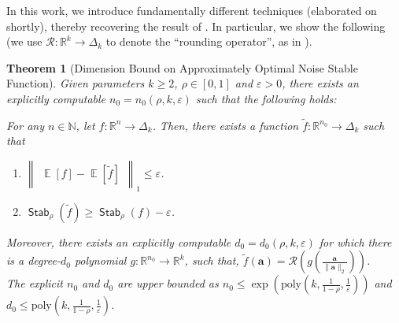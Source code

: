 \documentclass[11pt]{article}
\newcommand{\inparen}[1]{\left ( #1 \right )}
\newcommand{\norm}[2]{\begin{Vmatrix} #2 \end{Vmatrix}_{#1}}
\DeclareMathOperator*{\Ex}{\mathbb{E}}
\DeclareMathOperator*{\Stab}{\mathsf{Stab}}
\newcommand{\wtilde}[1]{\widetilde{#1}}
\newcommand{\eps}{\varepsilon}
\newcommand{\bbN}{{\mathbb N}}
\newcommand{\bbR}{{\mathbb R}}
\newcommand{\ba}{{\bm a}}
\newcommand{\calR}{\mathcal{R}}
\newcommand{\poly}{\mathrm{poly}}
\newtheorem{theorem}{Theorem}[section]
\begin{document}
In this work, we introduce fundamentally different techniques (elaborated on shortly), thereby recovering the result of \cite{DMN_NoiseStabilityComputable}. In particular, we show the following (we use $\calR : \bbR^k \to \Delta_k$ to denote the ``rounding operator'', as in ).

\begin{theorem}[Dimension Bound on Approximately Optimal Noise Stable Function]\label{th:noise-stability-informal}
	Given parameters $k \ge 2$, $\rho \in [0,1]$ and $\eps > 0$, there exists an explicitly computable $n_0 = n_0(\rho, k, \eps)$ such that the following holds:
	
	\noindent For any $n \in \bbN$, let $f : \bbR^n \to \Delta_k$. Then, there exists a function $\wtilde{f} : \bbR^{n_0} \to \Delta_k$ such that
	\begin{enumerate}
		\item $\norm{1}{\Ex[f] - \Ex[\wtilde{f}]} \le \eps$.
		\item $\Stab_\rho(\wtilde{f}) \ge \Stab_\rho(f) - \eps$.
	\end{enumerate}
	Moreover, there exists an explicitly computable $d_0 = d_0(\rho, k, \eps)$ for which there is a degree-$d_0$ polynomial $g : \bbR^{n_0} \to \bbR^k$, such that, $\wtilde{f}(\ba) = \calR\inparen{g\inparen{\frac{\ba}{\|\ba\|_2}}}$.\\%
	
	\noindent The explicit $n_0$ and $d_0$ are upper bounded as $n_0 \le \exp \inparen{\poly\inparen{k, \frac{1}{1-\rho}, \frac{1}{\eps}}}$ and $d_0 \le \poly\inparen{k, \frac{1}{1-\rho}, \frac{1}{\eps}}$.%
\end{theorem}
\end{document}
